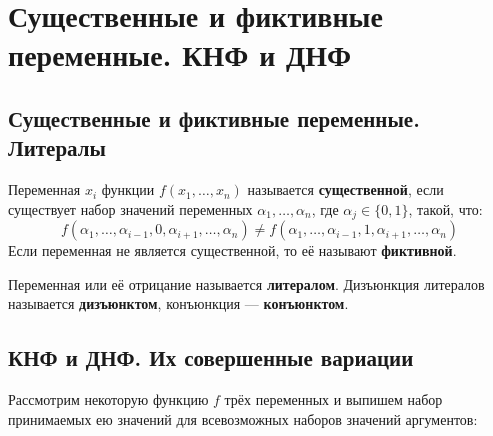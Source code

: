 \documentclass[11pt]{article}
\begin{document}
\section{Существенные и фиктивные переменные. КНФ и ДНФ}

\subsection{Существенные и фиктивные переменные. Литералы}

\begin{definition}
    Переменная $x_i$ функции $f(x_1, \ldots, x_n)$ называется \textbf{существенной},
    если существует набор значений переменных $\alpha_1, \ldots, \alpha_n$, где $\alpha_j \in \{0, 1\}$,
    такой, что:
    \[f\left(\alpha_1, \ldots, \alpha_{i - 1}, 0, \alpha_{i + 1}, \ldots, \alpha_n\right) \neq 
    f\left(\alpha_1, \ldots, \alpha_{i - 1}, 1, \alpha_{i + 1}, \ldots, \alpha_n\right)\]
    Если переменная не является существенной, то её называют \textbf{фиктивной}.
\end{definition}

\begin{definition}
    Переменная или её отрицание называется \textbf{литералом}. Дизъюнкция литералов называется
    \textbf{дизъюнктом}, конъюнкция --- \textbf{конъюнктом}.
\end{definition}

\subsection{КНФ и ДНФ. Их совершенные вариации}

Рассмотрим некоторую функцию $f$ трёх переменных и выпишем набор принимаемых ею значений для всевозможных наборов значений аргументов:
\end{document}
